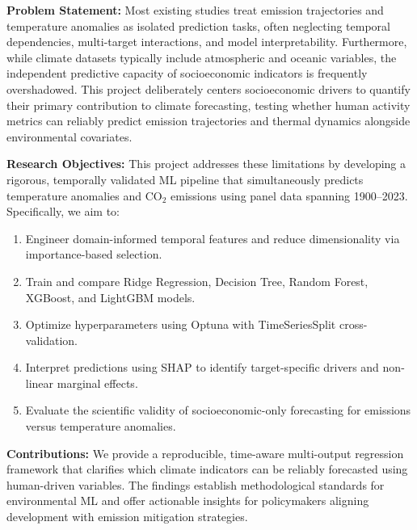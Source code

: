 \documentclass[12pt, a4paper]{article}
\begin{document}
\textbf{Problem Statement:} Most existing studies treat emission trajectories and temperature anomalies as isolated prediction tasks, often neglecting temporal dependencies, multi-target interactions, and model interpretability. Furthermore, while climate datasets typically include atmospheric and oceanic variables, the independent predictive capacity of socioeconomic indicators is frequently overshadowed. This project deliberately centers socioeconomic drivers to quantify their primary contribution to climate forecasting, testing whether human activity metrics can reliably predict emission trajectories and thermal dynamics alongside environmental covariates.

\textbf{Research Objectives:} This project addresses these limitations by developing a rigorous, temporally validated ML pipeline that simultaneously predicts temperature anomalies and CO$_2$ emissions using panel data spanning 1900--2023. Specifically, we aim to:
\begin{enumerate}[label=\arabic*., leftmargin=*]
    \item Engineer domain-informed temporal features and reduce dimensionality via importance-based selection.
    \item Train and compare Ridge Regression, Decision Tree, Random Forest, XGBoost, and LightGBM models.
    \item Optimize hyperparameters using Optuna with TimeSeriesSplit cross-validation.
    \item Interpret predictions using SHAP to identify target-specific drivers and non-linear marginal effects.
    \item Evaluate the scientific validity of socioeconomic-only forecasting for emissions versus temperature anomalies.
\end{enumerate}

\textbf{Contributions:} We provide a reproducible, time-aware multi-output regression framework that clarifies which climate indicators can be reliably forecasted using human-driven variables. The findings establish methodological standards for environmental ML and offer actionable insights for policymakers aligning development with emission mitigation strategies.
\end{document}
